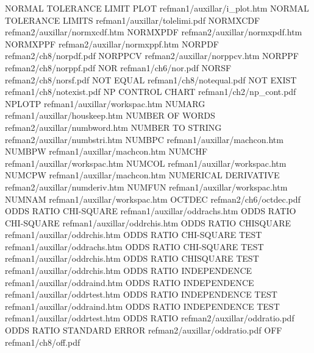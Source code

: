 NORMAL TOLERANCE LIMIT PLOT             refman1/auxillar/i_plot.htm
NORMAL TOLERANCE LIMITS                 refman1/auxillar/tolelimi.pdf
NORMXCDF                                refman2/auxillar/normxcdf.htm
NORMXPDF                                refman2/auxillar/normxpdf.htm
NORMXPPF                                refman2/auxillar/normxppf.htm
NORPDF                                  refman2/ch8/norpdf.pdf
NORPPCV                                 refman2/auxillar/norppcv.htm
NORPPF                                  refman2/ch8/norppf.pdf
NOR                                     refman1/ch6/nor.pdf
NORSF                                   refman2/ch8/norsf.pdf
NOT EQUAL                               refman1/ch8/notequal.pdf
NOT EXIST                               refman1/ch8/notexist.pdf
NP CONTROL CHART                        refman1/ch2/np_cont.pdf
NPLOTP                                  refman1/auxillar/workspac.htm
NUMARG                                  refman1/auxillar/houskeep.htm
NUMBER OF WORDS                         refman2/auxillar/numbword.htm
NUMBER TO STRING                        refman2/auxillar/numbstri.htm
NUMBPC                                  refman1/auxillar/machcon.htm
NUMBPW                                  refman1/auxillar/machcon.htm
NUMCHF                                  refman1/auxillar/workspac.htm
NUMCOL                                  refman1/auxillar/workspac.htm
NUMCPW                                  refman1/auxillar/machcon.htm
NUMERICAL DERIVATIVE                    refman2/auxillar/numderiv.htm
NUMFUN                                  refman1/auxillar/workspac.htm
NUMNAM                                  refman1/auxillar/workspac.htm
OCTDEC                                  refman2/ch6/octdec.pdf
ODDS RATIO CHI-SQUARE                   refman1/auxillar/oddrachs.htm
ODDS RATIO CHI-SQUARE                   refman1/auxillar/oddrchis.htm
ODDS RATIO CHISQUARE                    refman1/auxillar/oddrchis.htm
ODDS RATIO CHI-SQUARE TEST              refman1/auxillar/oddrachs.htm
ODDS RATIO CHI-SQUARE TEST              refman1/auxillar/oddrchis.htm
ODDS RATIO CHISQUARE TEST               refman1/auxillar/oddrchis.htm
ODDS RATIO INDEPENDENCE                 refman1/auxillar/oddraind.htm
ODDS RATIO INDEPENDENCE                 refman1/auxillar/oddrtest.htm
ODDS RATIO INDEPENDENCE TEST            refman1/auxillar/oddraind.htm
ODDS RATIO INDEPENDENCE TEST            refman1/auxillar/oddrtest.htm
ODDS RATIO                              refman2/auxillar/oddratio.pdf
ODDS RATIO STANDARD ERROR               refman2/auxillar/oddratio.pdf
OFF                                     refman1/ch8/off.pdf
